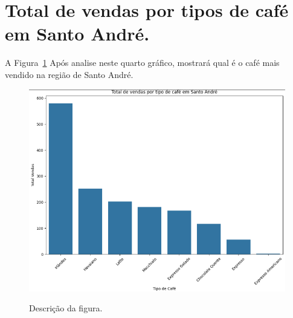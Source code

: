 \section{Total de vendas por tipos de café em Santo André. }
\label{sec:figura}
A Figura~\ref{figuras/Total-vendas-Santo-Andre.png} Após analise neste quarto gráfico, mostrará qual é o café mais vendido na região de Santo André.
\begin{figure}[!ht]
	{\centering
		\caption{Descrição da figura.}
		\includegraphics[width=1.0\textwidth]{figuras/Total-vendas-Santo-Andre.png}
		\label{figuras/Total-vendas-Santo-Andre.png}
	}
\end{figure} \\ \\ \\ \\ \\ \\ \\ 

